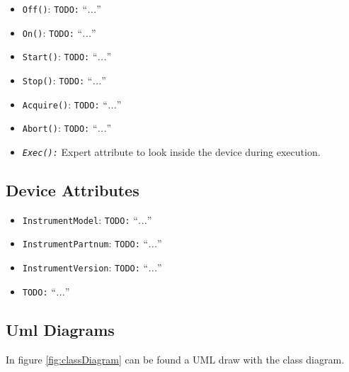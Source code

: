 \documentclass[a4paper,10pt]{article}
\newcommand{\todo}[1]{\texttt{\color{red}TODO:} ``\emph{#1}''}
\begin{document}
\begin{itemize}
    \item {\tt Off()}: \todo{...}
    \item {\tt On()}: \todo{...}
    \item {\tt Start()}: \todo{...}
    \item {\tt Stop()}: \todo{...}
    \item {\tt Acquire()}: \todo{...}
    \item {\tt Abort()}: \todo{...}
    \item {\tt \emph{Exec():}} Expert attribute to look inside the device during execution.
\end{itemize}

\subsection{Device Attributes}

\begin{itemize}
    \item {\tt InstrumentModel}: \todo{...}
    \item {\tt InstrumentPartnum}: \todo{...}
    \item {\tt InstrumentVersion}: \todo{...}
    \item \todo{...}
\end{itemize}

\subsection{Uml Diagrams}

In figure \ref{fig:classDiagram} can be found a UML draw with the class diagram.
\end{document}
